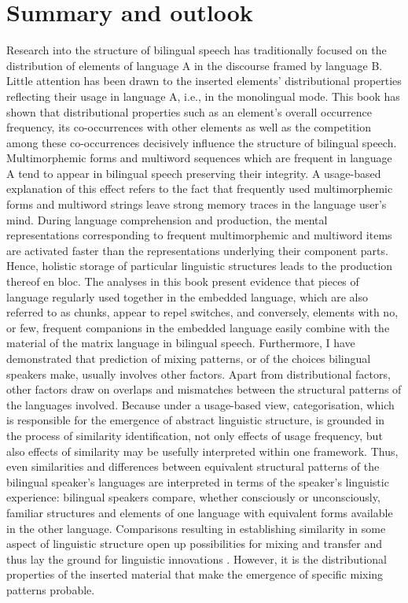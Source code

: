 \chapter{Summary and outlook}

Research into the structure of bilingual speech has traditionally focused on the distribution of elements of language A in the discourse framed by language B. Little attention has been drawn to the inserted elements’ distributional properties reflecting their usage in language A, i.e., in the monolingual mode. This book has shown that distributional properties such as an element's overall occurrence frequency, its co-occurrences with other elements as well as the competition among these co-occurrences decisively influence the structure of bilingual speech. Multimorphemic forms and multiword sequences which are frequent in language A tend to appear in bilingual speech preserving their integrity. A usage-based explanation of this effect refers to the fact that frequently used multimorphemic forms and multiword strings leave strong memory traces in the language user's mind. During language comprehension and production, the mental representations corresponding to frequent multimorphemic and multiword items are activated faster than the representations underlying their component parts. Hence, holistic storage of particular linguistic structures leads to the production thereof en bloc. The analyses in this book present evidence that pieces of language regularly used together in the embedded language, which are also referred to as chunks, appear to repel switches, and conversely, elements with no, or few, frequent companions in the embedded language easily combine with the material of the matrix language in bilingual speech. Furthermore, I have demonstrated that prediction of mixing patterns, or of the choices bilingual speakers make, usually involves other factors. Apart from distributional factors, other factors draw on overlaps and mismatches between the structural patterns of the languages involved. Because under a usage-based view, categorisation, which is responsible for the emergence of abstract linguistic structure, is grounded in the process of similarity identification, not only effects of usage frequency, but also effects of similarity may be usefully interpreted within one framework. Thus, even similarities and differences between equivalent structural patterns of the bilingual speaker's languages are interpreted in terms of the speaker's linguistic experience: bilingual speakers compare, whether consciously or unconsciously, familiar structures and elements of one language with equivalent forms available in the other language. Comparisons resulting in establishing similarity in some aspect of linguistic structure open up possibilities for mixing and transfer and thus lay the ground for linguistic innovations \citet[cf.][]{sebba-09}. However, it is the distributional properties of the inserted material that make the emergence of specific mixing patterns probable.

